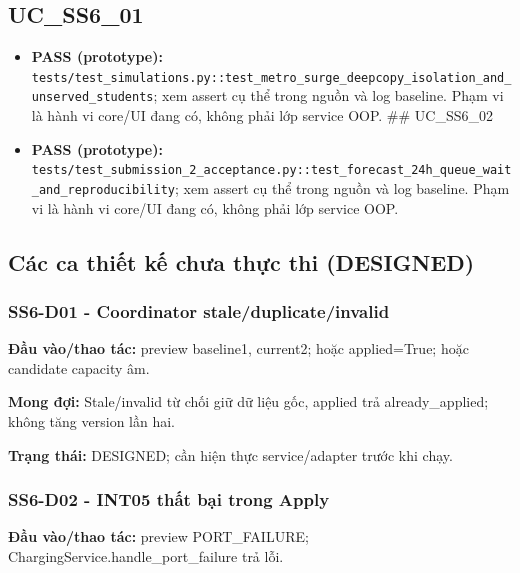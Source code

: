 \documentclass[11pt,a4paper]{article}
\begin{document}
\hypertarget{uc_ss6_01}{%
\subsection{UC\_SS6\_01}\label{uc_ss6_01}}

\begin{itemize}
\item
  \textbf{PASS (prototype):}
  \texttt{tests/test\_simulations.py::test\_metro\_surge\_deepcopy\_isolation\_and\_unserved\_students};
  xem assert cụ thể trong nguồn và log baseline. Phạm vi là hành vi
  core/UI đang có, không phải lớp service OOP. \#\# UC\_SS6\_02
\item
  \textbf{PASS (prototype):}
  \texttt{tests/test\_submission\_2\_acceptance.py::test\_forecast\_24h\_queue\_wait\_and\_reproducibility};
  xem assert cụ thể trong nguồn và log baseline. Phạm vi là hành vi
  core/UI đang có, không phải lớp service OOP.
\end{itemize}

\hypertarget{cuxe1c-ca-thiux1ebft-kux1ebf-chux1b0a-thux1ef1c-thi-designed}{%
\subsection{Các ca thiết kế chưa thực thi
(DESIGNED)}\label{cuxe1c-ca-thiux1ebft-kux1ebf-chux1b0a-thux1ef1c-thi-designed}}

\hypertarget{ss6-d01---coordinator-staleduplicateinvalid}{%
\subsubsection{SS6-D01 - Coordinator
stale/duplicate/invalid}\label{ss6-d01---coordinator-staleduplicateinvalid}}

\textbf{Đầu vào/thao tác:} preview baseline1, current2; hoặc
applied=True; hoặc candidate capacity âm.

\textbf{Mong đợi:} Stale/invalid từ chối giữ dữ liệu gốc, applied trả
already\_applied; không tăng version lần hai.

\textbf{Trạng thái:} DESIGNED; cần hiện thực service/adapter trước khi
chạy.

\hypertarget{ss6-d02---int05-thux1ea5t-bux1ea1i-trong-apply}{%
\subsubsection{SS6-D02 - INT05 thất bại trong
Apply}\label{ss6-d02---int05-thux1ea5t-bux1ea1i-trong-apply}}

\textbf{Đầu vào/thao tác:} preview PORT\_FAILURE;
ChargingService.handle\_port\_failure trả lỗi.
\end{document}
